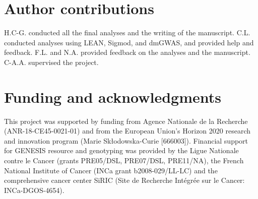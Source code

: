 \documentclass[twocolumn, 11pt]{article}
\begin{document}
\section*{Author contributions}

H.C-G. conducted all the final analyses and the writing of the manuscript. C.L. conducted analyses using LEAN, Sigmod, and dmGWAS, and provided help and feedback. F.L. and N.A. provided feedback on the analyses and the manuscript. C-A.A. supervised the project.

\section*{Funding and acknowledgments}

This project was supported by funding from Agence Nationale de la Recherche (ANR-18-CE45-0021-01) and from the European Union’s Horizon 2020 research and innovation program (Marie Skłodowska-Curie [666003]). Financial support for GENESIS resource and genotyping was provided by the Ligue Nationale contre le Cancer (grants PRE05/DSL, PRE07/DSL, PRE11/NA), the French National Institute of Cancer (INCa grant b2008-029/LL-LC) and the comprehensive cancer center SiRIC (Site de Recherche Intégrée sur le Cancer: INCa-DGOS-4654).
\end{document}
